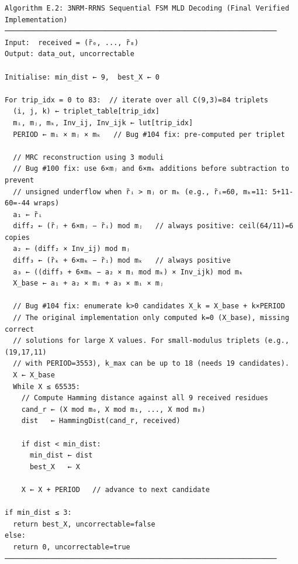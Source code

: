 \begin{verbatim}
Algorithm E.2: 3NRM-RRNS Sequential FSM MLD Decoding (Final Verified Implementation)
─────────────────────────────────────────────────────────────────
Input:  received = (r̃₀, ..., r̃₈)
Output: data_out, uncorrectable

Initialise: min_dist ← 9,  best_X ← 0

For trip_idx = 0 to 83:  // iterate over all C(9,3)=84 triplets
  (i, j, k) ← triplet_table[trip_idx]
  mᵢ, mⱼ, mₖ, Inv_ij, Inv_ijk ← lut[trip_idx]
  PERIOD ← mᵢ × mⱼ × mₖ   // Bug #104 fix: pre-computed per triplet

  // MRC reconstruction using 3 moduli
  // Bug #100 fix: use 6×mⱼ and 6×mₖ additions before subtraction to prevent
  // unsigned underflow when r̃ᵢ > mⱼ or mₖ (e.g., r̃ᵢ=60, mₖ=11: 5+11-60=-44 wraps)
  a₁ ← r̃ᵢ
  diff₂ ← (r̃ⱼ + 6×mⱼ − r̃ᵢ) mod mⱼ   // always positive: ceil(64/11)=6 copies
  a₂ ← (diff₂ × Inv_ij) mod mⱼ
  diff₃ ← (r̃ₖ + 6×mₖ − r̃ᵢ) mod mₖ   // always positive
  a₃ ← ((diff₃ + 6×mₖ − a₂ × mᵢ mod mₖ) × Inv_ijk) mod mₖ
  X_base ← a₁ + a₂ × mᵢ + a₃ × mᵢ × mⱼ

  // Bug #104 fix: enumerate k>0 candidates X_k = X_base + k×PERIOD
  // The original implementation only computed k=0 (X_base), missing correct
  // solutions for large X values. For small-modulus triplets (e.g., (19,17,11)
  // with PERIOD=3553), k_max can be up to 18 (needs 19 candidates).
  X ← X_base
  While X ≤ 65535:
    // Compute Hamming distance against all 9 received residues
    cand_r ← (X mod m₀, X mod m₁, ..., X mod m₈)
    dist   ← HammingDist(cand_r, received)

    if dist < min_dist:
      min_dist ← dist
      best_X   ← X

    X ← X + PERIOD   // advance to next candidate

if min_dist ≤ 3:
  return best_X, uncorrectable=false
else:
  return 0, uncorrectable=true
─────────────────────────────────────────────────────────────────
\end{verbatim}

